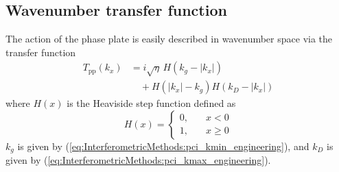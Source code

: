 \subsection{Wavenumber transfer function}
\label{sec:InterferometricMethods:pci:wavenumber_response}
The action of the phase plate is easily described in wavenumber space
via the transfer function
\begin{equation}
  \begin{aligned}
    T_{\text{pp}}(k_x)
    &=
    i \sqrt{\eta} \, H(k_g - |k_x|)
    \\
    &\quad +
    H(|k_x| - k_g)
    H(k_D - |k_x|)
  \end{aligned}
  \label{eq:InterferometricMethods:phase_plate_transfer_function}
\end{equation}
where $H(x)$ is the Heaviside step function defined as
\begin{equation}
  H(x)
  =
  \begin{cases}
    0, \quad &x < 0 \\
    1, \quad &x \geq 0
  \end{cases}
  \label{eq:InterferometricMethods:Heaviside_step_function}
\end{equation}
$k_g$ is given by
(\ref{eq:InterferometricMethods:pci_kmin_engineering}), and
$k_D$ is given by
(\ref{eq:InterferometricMethods:pci_kmax_engineering}).




